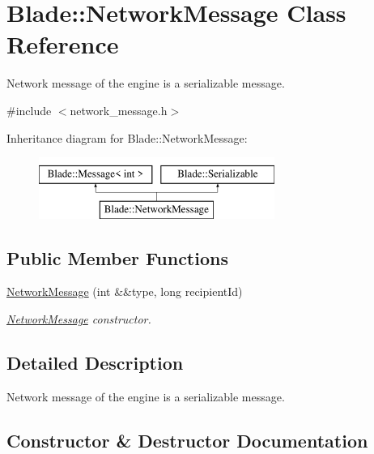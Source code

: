 \hypertarget{class_blade_1_1_network_message}{}\section{Blade\+:\+:Network\+Message Class Reference}
\label{class_blade_1_1_network_message}


Network message of the engine is a serializable message.  




{\ttfamily \#include $<$network\+\_\+message.\+h$>$}

Inheritance diagram for Blade\+:\+:Network\+Message\+:\begin{figure}[H]
\begin{center}
\leavevmode
\includegraphics[height=2.000000cm]{class_blade_1_1_network_message}
\end{center}
\end{figure}
\subsection*{Public Member Functions}
\begin{DoxyCompactItemize}
\item 
\hyperlink{class_blade_1_1_network_message_a4711d53f8f0df27056b814b7eca31efc}{Network\+Message} (int \&\&type, long recipient\+Id)
\begin{DoxyCompactList}\small\item\em \hyperlink{class_blade_1_1_network_message}{Network\+Message} constructor. \end{DoxyCompactList}\end{DoxyCompactItemize}


\subsection{Detailed Description}
Network message of the engine is a serializable message. 

\subsection{Constructor \& Destructor Documentation}
\mbox{\label{class_blade_1_1_network_message_a4711d53f8f0df27056b814b7eca31efc}} 
